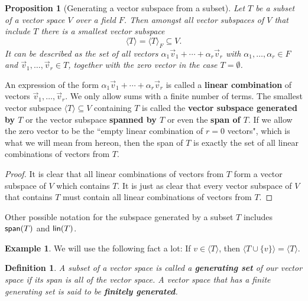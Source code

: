 \documentclass[11pt]{amsbook}
\newtheorem{definition}[theorem]{Definition}
\newtheorem{proposition}[theorem]{Proposition}
\theoremstyle{definition}
\newtheorem{ex}[theorem]{Example}
\begin{document}
\begin{proposition}[Generating a vector subspace from a subset] \label{generatingsubsp} Let $T$ be a subset of a vector space $V$ over a field $F$. Then amongst all vector subspaces of $V$ that include $T$ there is a smallest vector subspace $$\langle T \rangle = \langle T \rangle_F \subseteq V.$$ It can be described as the set of all vectors $\alpha_1 \vec{v}_1+ \cdots + \alpha_r \vec{v}_r$ with $\alpha_1 , \ldots , \alpha_r \in F$ and $\vec{v}_1, \ldots,
 \vec{v}_r\in T$, together with the zero vector in the case $T = \emptyset$.
\end{proposition}

An expression of the form $\alpha_1 \vec{v}_1+ \cdots + \alpha_r \vec{v}_r$ is called a {\bf linear combination} of vectors $\vec{v}_1, \ldots , \vec{v}_r$. We only allow sums with a finite number of terms. The smallest vector subspace $\langle T \rangle \subseteq V$ containing $T$ is called the {\bf vector subspace generated by $T$} or the vector subspace {\bf spanned by $T$} or even the {\bf span of $T$}. If we allow the zero vector to be the ``empty linear combination of $r=0$ vectors", which is what we will mean from hereon, then the span of $T$ is exactly the set of all linear combinations of vectors from $T$.

\begin{proof} It is clear that all linear combinations of vectors from $T$ form a vector subspace of $V$ which contains $T$. It is just as clear that every vector subspace of $V$ that contains $T$ must contain all linear combinations of vectors from $T$. \end{proof}

Other possible notation for the subspace generated by a subset $T$ includes ${\sf span}(T)$ and ${\sf lin}(T)$.

\begin{ex} We will use the following fact a lot: If $v\in \langle T \rangle$, then $\langle T \cup \{v\}\rangle = \langle T \rangle$. 
\end{ex}

\begin{definition}
A subset of a vector space is called a {\bf generating set} of our vector space if its span is all of the vector space. A vector space that has a finite generating set is said to be {\bf finitely generated}.
\end{definition}
\end{document}
